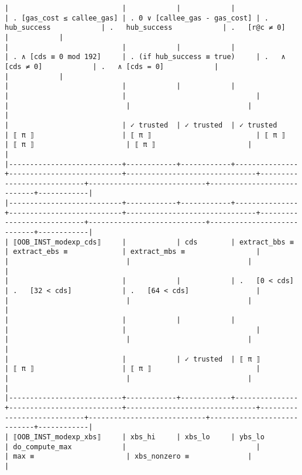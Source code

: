 \documentclass[varwidth=\maxdimen,margin=0.5cm,multi={verbatim}]{standalone}
\begin{document}
\begin{verbatim}
|                           |            |            |               | . [gas_cost ≤ callee_gas] | . 0 ∨ [callee_gas - gas_cost] | .   hub_success            | .   hub_success            | .   [r@c ≠ 0]              |            |
|                           |            |            |               | . ∧ [cds ≡ 0 mod 192]     | . (if hub_success ≡ true)     | .   ∧ [cds ≠ 0]            | .   ∧ [cds = 0]            |                            |            |
|                           |            |            |               |                           |                               |                            |                            |                            |            |
|                           | ✓ trusted  | ✓ trusted  | ✓ trusted     | ⟦ π ⟧                     | ⟦ π ⟧                         | ⟦ π ⟧                      | ⟦ π ⟧                      | ⟦ π ⟧                      |            |
|---------------------------+------------+------------+---------------+---------------------------+-------------------------------+----------------------------+----------------------------+----------------------------+------------|
|---------------------------+------------+------------+---------------+---------------------------+-------------------------------+----------------------------+----------------------------+----------------------------+------------|
| ⟦OOB_INST_modexp_cds⟧     |            | cds        | extract_bbs ≡ | extract_ebs ≡             | extract_mbs ≡                 |                            |                            |                            |            |
|                           |            |            | .   [0 < cds] | .   [32 < cds]            | .   [64 < cds]                |                            |                            |                            |            |
|                           |            |            |               |                           |                               |                            |                            |                            |            |
|                           |            | ✓ trusted  | ⟦ π ⟧         | ⟦ π ⟧                     | ⟦ π ⟧                         |                            |                            |                            |            |
|---------------------------+------------+------------+---------------+---------------------------+-------------------------------+----------------------------+----------------------------+----------------------------+------------|
| ⟦OOB_INST_modexp_xbs⟧     | xbs_hi     | xbs_lo     | ybs_lo        | do_compute_max            |                               |                            | max ≡                      | xbs_nonzero ≡              |            |

\end{verbatim}
\end{document}
